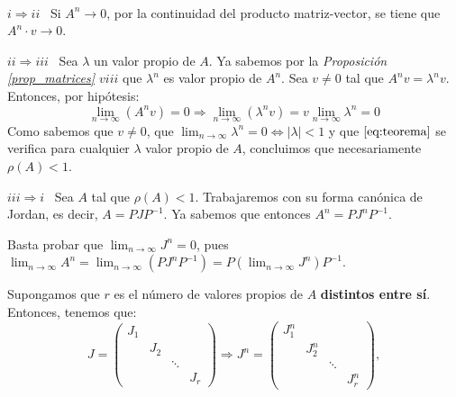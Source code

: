 \documentclass[11pt, a4paper]{article}
\makeatletter
\newif\IfInSansMode
\let\oldsf\sffamily
\renewcommand*{\sffamily}{\oldsf\mathversion{sans}\InSansModetrue}
\let\oldnorm\normalfont
\renewcommand*{\normalfont}{\oldnorm\InSansModefalse\mathversion{normal}}
\renewenvironment{proof}[1][\proofname] {\vspace{-15pt}\par\pushQED{\qed}\normalfont\topsep6\p@\@plus6\p@\relax\trivlist\item[\hskip\labelsep\it#1\@addpunct{.}]\ignorespaces}{\popQED\endtrivlist\@endpefalse}
\numberwithin{equation}{section}
\newcommand{\la}{\lambda}
\renewenvironment{proof}[1][\proofname] {\par\pushQED{\qed}\normalfont\topsep6\p@\@plus6\p@\relax\trivlist\item[\hskip\labelsep\itshape\sffamily#1\@addpunct{.}]\ignorespaces}{\popQED\endtrivlist\@endpefalse}
\theoremstyle{theorem-style}
\theoremstyle{definition-style}
\theoremstyle{remark-style}
\theoremstyle{example-style}
\makeatother
\begin{document}
\begin{proof}\hfill\\
    $\boxed{i \Rightarrow ii}$ \ Si $A^n \rightarrow 0$, por la continuidad del producto matriz-vector, se tiene que $A^n \cdot v \rightarrow 0$.
    
    $\boxed{ii \Rightarrow iii}$ \ Sea $\lambda$ un valor propio de $A$. Ya sabemos por la \textit{Proposición \ref{prop_matrices} $viii$} que $\lambda^n$ es valor propio de $A^n$. Sea $v\ne 0$ tal que $A^n v = \la^n v$. Entonces, por hipótesis: \begin{equation} \label{eq:teorema}
\lim_{n \to \infty}(A^n v) = 0 \Rightarrow \lim_{n \to \infty} (\lambda^n v) = v\lim_{n\to\infty} \la^n = 0
\end{equation}
   Como sabemos que $v\ne0$, que $\displaystyle \lim_{n\to\infty} \la^n = 0 \iff |\la| < 1$ y que $\eqref{eq:teorema}$ se verifica para cualquier $\la$ valor propio de $A$, concluimos que necesariamente $\rho(A) < 1$.

    $\boxed{iii \Rightarrow i}$ \ Sea $A$ tal que $\rho(A) < 1$. Trabajaremos con su forma canónica de Jordan, es decir, $A = PJP^{-1}$. Ya sabemos que entonces $A^n = PJ^nP^{-1}$.

    Basta probar que $\displaystyle \lim_{n \to \infty} J^n = 0$, pues $\displaystyle \lim_{n \to \infty} A^n = \lim_{n \to \infty} (PJ^nP^{-1}) = P(\lim_{n \to \infty} J^n)P^{-1}$.

    Supongamos que $r$ es el número de valores propios de $A$ \textbf{distintos entre sí}. Entonces, tenemos que: $$J = \begin{pmatrix}
        J_1 & & & \\
            & J_2 & & \\
            & & \ddots & \\
            & & & J_r
    \end{pmatrix} \Rightarrow J^n = \begin{pmatrix}
         J_1^n & & & \\
            & J_2^n & & \\
            & & \ddots & \\
            & & & J_r^n
    \end{pmatrix},$$


\end{proof}
\end{document}

